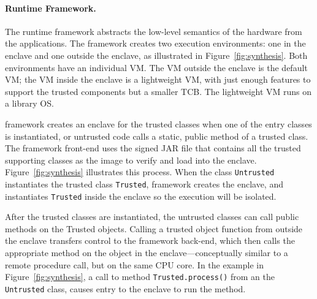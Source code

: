 




\paragraph{\systemname{} Runtime Framework.}
The \systemname{} runtime framework abstracts the low-level semantics of the \sgx{} hardware from the applications.
The \systemname{} framework creates two \java{} execution environments: 
one in the enclave and one outside the enclave, as illustrated in Figure~\ref{fig:synthesis}.
Both environments have an individual \java{} VM.
The \java{} VM outside the enclave is the default \java{} VM; the \java{} VM inside the enclave is a lightweight \java{} VM,
with just enough features to support the trusted components but a smaller TCB.
The lightweight \java{} VM runs on a library OS.

 
\systemname{} framework creates an enclave for the trusted classes
when one of the entry classes is instantiated,
or untrusted code calls a static, public method of a trusted class.
The \systemname{} framework front-end uses the signed JAR file that
contains all the trusted supporting classes
as the image to verify and load into the enclave.
Figure~\ref{fig:synthesis} illustrates this process.
When the class {\tt Untrusted} instantiates the trusted class {\tt Trusted},
\systemname{} framework creates the enclave,
and instantiates {\tt Trusted} inside the enclave so the execution will be isolated.


After the trusted classes are instantiated, the untrusted classes can call public methods on the Trusted objects.
Calling a trusted object function from outside the enclave transfers control to the \systemname{} framework back-end, which then 
calls the appropriate method on the object in the enclave---conceptually similar to a remote procedure call, but on the same CPU core.
In the example in Figure~\ref{fig:synthesis}, a call to method {\tt Trusted.process()} from an the {\tt Untrusted} class,
causes entry to the enclave to run the method.

